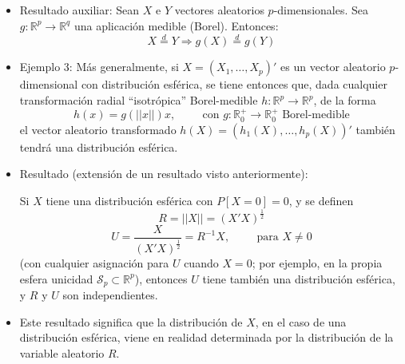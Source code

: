 \documentclass[11pt,a4paper]{article}
\begin{document}
\begin{itemize}
\item Resultado auxiliar: Sean $X$ e $Y$ vectores aleatorios $p$-dimensionales. Sea $g: \mathbb{R}^{p} \to \mathbb{R}^{q}$ una aplicación medible (Borel). Entonces:
$$X \overset{d}{=} Y \Rightarrow g(X) \overset{d}{=} g(Y)$$

\item Ejemplo 3: Más generalmente, si $X = (X_{1}, \dots, X_{p})'$ es un vector aleatorio $p$-dimensional con distribución esférica, se tiene entonces que, dada cualquier transformación radial ``isotrópica'' Borel-medible $h: \mathbb{R}^{p} \to \mathbb{R}^{p}$, de la forma
$$h(x) = g(||x||)x, \hspace{1cm} \text{con } g: \mathbb{R}_{0}^{+} \to \mathbb{R}_{0}^{+} \text{ Borel-medible}$$
el vector aleatorio transformado $h(X) = (h_{1}(X), \dots, h_{p}(X))'$ también tendrá una distribución esférica.

\item Resultado (extensión de un resultado visto anteriormente):

Si $X$ tiene una distribución esférica con $P[X=0]=0$, y se definen
$$R = ||X|| = (X'X)^{\frac{1}{2}}$$
$$U = \frac{X}{(X'X)^{\frac{1}{2}}} = R^{-1}X, \hspace{1cm} \text{para } X \neq 0$$
(con cualquier asignación para $U$ cuando $X = 0$; por ejemplo, en la propia esfera unicidad $\mathcal{S}_{p} \subset \mathbb{R}^{p}$), entonces $U$ tiene también una distribución esférica, y $R$ y $U$ son independientes.

\item Este resultado significa que la distribución de $X$, en el caso de una distribución esférica, viene en realidad determinada por la distribución de la variable aleatorio $R$.
\end{itemize}
\end{document}
